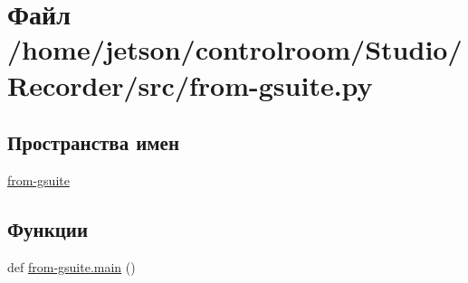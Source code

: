 \hypertarget{_recorder_2src_2from-gsuite_8py}{}\section{Файл /home/jetson/controlroom/\+Studio/\+Recorder/src/from-\/gsuite.py}
\label{_recorder_2src_2from-gsuite_8py}
\subsection*{Пространства имен}
\begin{DoxyCompactItemize}
\item 
 \hyperlink{namespacefrom-gsuite}{from-\/gsuite}
\end{DoxyCompactItemize}
\subsection*{Функции}
\begin{DoxyCompactItemize}
\item 
def \hyperlink{namespacefrom-gsuite_a431d5ae5f08baa594842e68180930f6c}{from-\/gsuite.\+main} ()
\end{DoxyCompactItemize}
